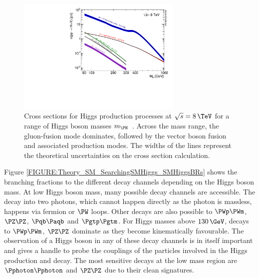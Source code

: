 \begin{figure}[!htb]
 \includegraphics[width=0.7\textwidth]{Chapter01/Images/Higgs_XS_8TeV_lx.pdf}
\caption[Cross sections for Higgs production processes at $\sqrt{s}=8\,\TeV$ for a range of Higgs boson masses.]
{Cross sections for Higgs production processes at $\sqrt{s}=8\,\TeV$ for a range of Higgs boson masses $m_{\PH}$~\cite{ARTICLE:HandbookofLHCHiggsCrossSectionsHiggsProperties}. Across the mass range, the gluon-fusion mode dominates, followed by the vector boson fusion and associated production modes. The widths of the lines represent the theoretical uncertainties on the cross section calculation.}
\label{FIGURE:Theory_SM_SearchingSMHiggs_SMHiggsXS}
\end{figure}

Figure \ref{FIGURE:Theory_SM_SearchingSMHiggs_SMHiggsBRs} shows the branching fractions to the different decay channels depending on the Higgs boson mass. At low Higgs boson mass, many possible decay channels are accessible. The decay into two photons, which cannot happen directly as the photon is massless, happens via fermion or $\PW$ loops. Other decays are also possible to $\PWp\PWm$, $\PZ\PZ$, $\Pqb\Paqb$ and $\Pgtp\Pgtm$. For Higgs masses above $130\,\GeV$, decays to $\PWp\PWm$, $\PZ\PZ$ dominate as they become kinematically favourable. The observation of a Higgs boson in any of these decay channels is in itself important and gives a handle to probe the couplings of the particles involved in the Higgs production and decay. The most sensitive decays at the low mass region are $\Pphoton\Pphoton$ and $\PZ\PZ$ due to their clean signatures.

